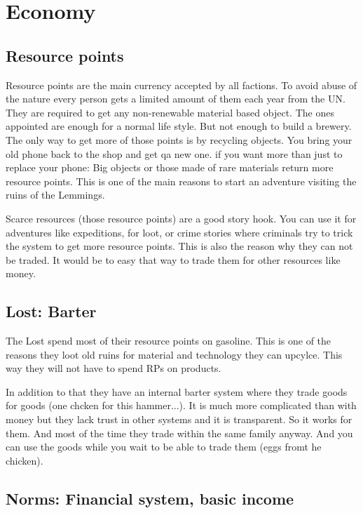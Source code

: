\chapter{Economy}

\section{Resource points}
\label{sec:Resource points}
Resource points are the main currency accepted by all factions. To avoid abuse of the nature every person gets a limited amount of them each year from the UN. They are required to get any non-renewable material based object. The ones appointed are enough for a normal life style. But not enough to build a brewery. The only way to get more of those points is by recycling objects. You bring your old phone back to the shop and get qa new one. if you want more than just to replace your phone: Big objects or those made of rare materials return more resource points. This is one of the main reasons to start an adventure visiting the ruins of the Lemmings. 

\begin{reason}[]
    Scarce resources (those resource points) are a good story hook. You can use it for adventures like expeditions, for loot, or crime stories where criminals try to trick the system to get more resource points. This is also the reason why they can not be traded. It would be to easy that way to trade them for other resources like money.
\end{reason}

\section{Lost: Barter}
\label{sec:Barter}
The Lost spend most of their resource points on gasoline. This is one of the reasons they loot old ruins for material and technology they can upcylce. This way they will not have to spend RPs on products.

In addition to that they have an internal barter system where they trade goods for goods (one chcken for this hammer...).
It is much more complicated than with money but they lack trust in other systems and it is transparent. So it works for them. And most of the time they trade within the same family anyway.
And you can use the goods while you wait to be able to trade them (eggs fromt he chicken).


\section{Norms: Financial system, basic income}
\label{sec:basic income}

